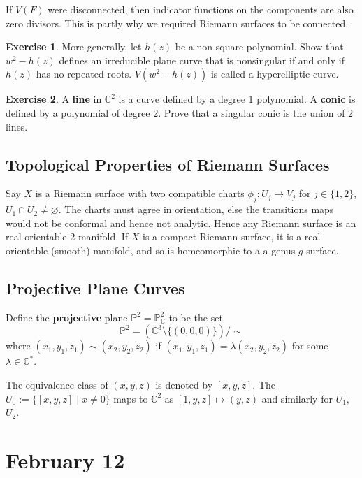 \documentclass[12pt]{article}
\newcommand{\cx}{\mathbb{C}}
\newcommand{\p}{\mathbb{P}}
\theoremstyle{definition}
\newtheorem{exercise}{Exercise}
\theoremstyle{remark}
\begin{document}
If $V(F)$ were disconnected, then indicator functions on the components are also zero divisors. This is partly why we required Riemann surfaces to be connected.
\begin{exercise}
    More generally, let $h(z)$ be a non-square polynomial. Show that $w^2-h(z)$ defines an irreducible plane curve that is nonsingular if and only if $h(z)$ has no repeated roots. $V(w^2-h(z))$ is called a hyperelliptic curve.
\end{exercise}
\begin{exercise}
    A \textbf{line} in $\cx^2$ is a curve defined by a degree 1 polynomial. A \textbf{conic} is defined by a polynomial of degree 2. Prove that a singular conic is the union of 2 lines.
\end{exercise}
\subsection{Topological Properties of Riemann Surfaces}
Say $X$ is a Riemann surface with two compatible charts $\phi_j:U_j\to V_j$ for $j\in\{1,2\}$, $U_1\cap U_2\neq\varnothing$. The charts must agree in orientation, else the transitions maps would not be conformal and hence not analytic. Hence any Riemann surface is an real orientable 2-manifold. If $X$ is a compact Riemann surface, it is a real orientable (smooth) manifold, and so is homeomorphic to a a genus $g$ surface. 
\subsection{Projective Plane Curves}
Define the \textbf{projective} plane $\p^2=\p_{\cx}^2$ to be the set 
\begin{equation}
    \p^2=\left(\cx^3\setminus\{(0,0,0)\}\right)\big/\sim
\end{equation}
where $(x_1,y_1,z_1)\sim(x_2,y_2,z_2)$ if $(x_1,y_1,z_1)=\lambda(x_2,y_2,z_2)$ for some $\lambda\in\cx^*$.

The equivalence class of $(x,y,z)$ is denoted by $[x,y,z]$. The $U_0:=\{[x,y,z]\mid x\neq0\}$ maps to $\cx^2$ as $[1,y,z]\mapsto(y,z)$ and similarly for $U_1$, $U_2$.
\section{February 12}
\end{document}
